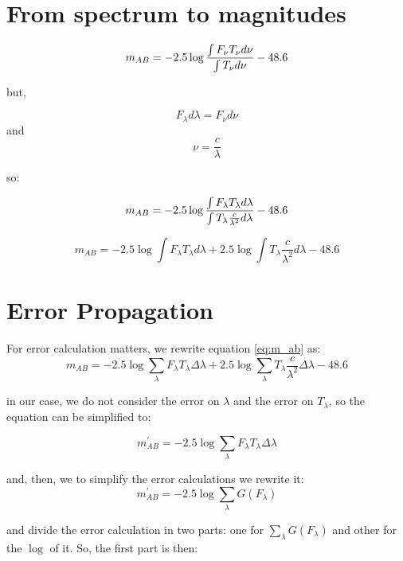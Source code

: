 \documentclass[11pt]{article}
\def\ni{\noindent}                                       %
\begin{document}
\section{From spectrum to magnitudes}

\begin{equation}
m_{AB} = -2.5 \log{ {\int F_\nu T_\nu d\nu}\over{\int T_\nu d\nu} } - 48.6
\end{equation}

\ni but,

$$ F_\lambda d\lambda = F_\nu d\nu $$ and $$ \nu = \frac{c}{\lambda} $$

so:

\begin{equation}
m_{AB} = -2.5 \log { {\int F_\lambda T_\lambda d\lambda}\over{\int T_\lambda \frac{c}{\lambda^2} d\lambda} } - 48.6
\end{equation}

\begin{equation}
\label{eq:m_ab}
m_{A B} = -2.5 \log \int F_\lambda T_\lambda d\lambda + 2.5 \log \int T_\lambda \frac{c}{\lambda^2} d\lambda - 48.6
\end{equation}

\section{Error Propagation}

For error calculation matters, we rewrite equation \ref{eq:m_ab} as:
\begin{equation}
\label{eq:m_ab_sum}
m_{A B} = -2.5 \log \sum_\lambda F_\lambda T_\lambda \Delta \lambda + 2.5 \log \sum_\lambda T_\lambda \frac{c}{\lambda^2} \Delta\lambda - 48.6
\end{equation}

\ni in our case, we do not consider the error on $\lambda$ and the error on
$T_\lambda$, so the equation can be simplified to:

\begin{equation}
m_{A B}^\prime = -2.5 \log \sum_\lambda F_\lambda T_\lambda \Delta \lambda
\end{equation}

and, then, we to simplify the error calculations we rewrite it:
\begin{equation}
m_{A B}^\prime = -2.5 \log \sum_\lambda G(F_\lambda)
\end{equation}

\ni and divide the error calculation in two parts: one for $\sum_\lambda G(F_\lambda)$ and other
for the $\log$ of it. So, the first part is then:
\end{document}
